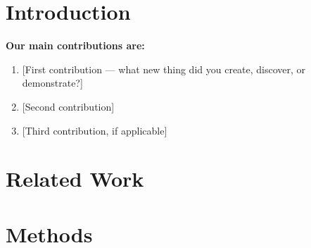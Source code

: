\documentclass[10pt]{article}
\newif\ifshowguidance
\newcommand{\guidance}[1]{\ifshowguidance{#1\par}\fi}
\begin{document}
\section{Introduction}

\guidance{What problem are you addressing and why does it matter?
Connect it to your work: we want to know why your work is practically valuable.}

\guidance{Provide enough background for readers to understand your work.
If relevant, briefly describe the threat model or failure mode you're addressing; reference
prior work that motivates why it is worth addressing, or explain it yourself.}

\guidance{Aspire to clearly list your most important contributions that go beyond what exists today.}

\textbf{Our main contributions are:}
\begin{enumerate}
  \item {[First contribution --- what new thing did you create, discover, or demonstrate?]}
  \item {[Second contribution]}
  \item {[Third contribution, if applicable]}
\end{enumerate}

\section{Related Work}

\guidance{What prior work is most similar, and how does your work differ?
Cite the most relevant papers, tools, or projects. Explain what gap your work addresses.}

\guidance{Some questions which may help:
\begin{enumerate}[label=(\alph*)]
  \item When and why would someone use your method over the existing state-of-the-art?
  \item What information/insight does your method provide which we did not have before?
\end{enumerate}}

\section{Methods}

\guidance{Describe your approach clearly enough that someone could replicate it. Include key
design choices and justify them where relevant (hint: the more you can back up your design
choices by referencing prior work, the better).}
\end{document}
